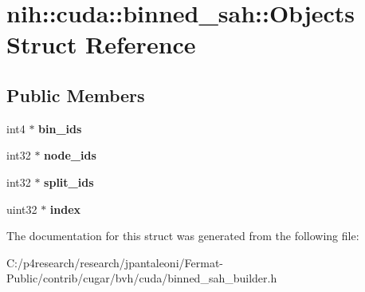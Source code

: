 \hypertarget{structnih_1_1cuda_1_1binned__sah_1_1_objects}{}\section{nih\+:\+:cuda\+:\+:binned\+\_\+sah\+:\+:Objects Struct Reference}
\label{structnih_1_1cuda_1_1binned__sah_1_1_objects}
\subsection*{Public Members}
\begin{DoxyCompactItemize}
\item 
\mbox{\label{structnih_1_1cuda_1_1binned__sah_1_1_objects_a3f57033cd09c0296af4a05c95db4a97e}} 
int4 $\ast$ {\bfseries bin\+\_\+ids}
\item 
\mbox{\label{structnih_1_1cuda_1_1binned__sah_1_1_objects_a39e5daf86a940b22eb79fafe506db1ec}} 
int32 $\ast$ {\bfseries node\+\_\+ids}
\item 
\mbox{\label{structnih_1_1cuda_1_1binned__sah_1_1_objects_a78a94b6bd08e2ee0e0e9a7e1fe9b9476}} 
int32 $\ast$ {\bfseries split\+\_\+ids}
\item 
\mbox{\label{structnih_1_1cuda_1_1binned__sah_1_1_objects_a0709f0e3baf173f76f712fb049ba8a7e}} 
uint32 $\ast$ {\bfseries index}
\end{DoxyCompactItemize}


The documentation for this struct was generated from the following file\+:\begin{DoxyCompactItemize}
\item 
C\+:/p4research/research/jpantaleoni/\+Fermat-\/\+Public/contrib/cugar/bvh/cuda/binned\+\_\+sah\+\_\+builder.\+h\end{DoxyCompactItemize}
